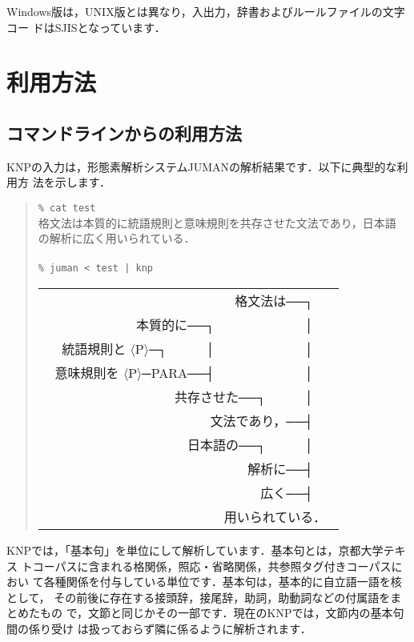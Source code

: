 \documentclass[a4j,11pt,titlepage]{jarticle}
\def\fl{$\langle$}
\def\fr{$\rangle$}
\begin{document}
\vspace*{3ex}

Windows版は，UNIX版とは異なり，入出力，辞書およびルールファイルの文字コー
ドはSJISとなっています．


\section{利用方法}

\subsection{コマンドラインからの利用方法}

KNPの入力は，形態素解析システムJUMANの解析結果です．以下に典型的な利用方
法を示します．

\begin{quote}
\texttt{\% cat test} \\
格文法は本質的に統語規則と意味規則を共存させた文法であり，日本語 \\
の解析に広く用いられている．\\
 \\
\texttt{\% juman < test | knp} \\
\begin{tabular}[t]{r}
　　　　　　　　　　　　　　格文法は──┐　\ \\[-4pt]
　　　　　　本質的に──┐　　　　　　　│　\ \\[-4pt]
統語規則と \fl P\fr ─┐　　　│　　　　　　　│　\ \\[-4pt]
意味規則を \fl P\fr ─PARA──┤　　　　　　　│　\ \\[-4pt]
　　　　　　　　　共存させた──┐　　　│　\ \\[-4pt]
　　　　　　　　　　　　文法であり，──┤　\ \\[-4pt]
　　　　　　　　　　日本語の──┐　　　│　\ \\[-4pt]
　　　　　　　　　　　　　　　解析に──┤　\ \\[-4pt]
　　　　　　　　　　　　　　　　広く──┤　\ \\[-4pt]
　　　　　　　　　　　　　　用いられている．\ \\
\end{tabular}
\end{quote}

KNPでは，「基本句」を単位にして解析しています．基本句とは，京都大学テキス
トコーパスに含まれる格関係，照応・省略関係，共参照タグ付きコーパスにおい
て各種関係を付与している単位です．基本句は，基本的に自立語一語を核として，
その前後に存在する接頭辞，接尾辞，助詞，助動詞などの付属語をまとめたもの
で，文節と同じかその一部です．現在のKNPでは，文節内の基本句間の係り受け
は扱っておらず隣に係るように解析されます．
\end{document}
